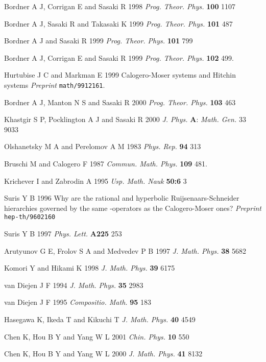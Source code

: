 \documentclass[a4paper,12pt]{article}
\begin{document}
\begin{thebibliography}{99}
  Bordner A J, Corrigan E and Sasaki R 1998 \textit{Prog.
Theor. Phys. }\textbf{100} 1107

  Bordner A J, Sasaki R and Takasaki K 1999 \textit{Prog.
Theor. Phys.} \textbf{101} 487

  Bordner A J and Sasaki R 1999 \textit{Prog. Theor. Phys.}
\textbf{101} 799

  Bordner A J, Corrigan E and Sasaki R 1999 \textit{Prog.
Theor. Phys. }\textbf{102} 499.

  Hurtubise J C and Markman E 1999 Calogero-Moser systems and
Hitchin systems \textit{Preprint} \texttt{math/9912161}.

  Bordner A J, Manton N S and Sasaki R 2000 \textit{Prog.
Theor. Phys. }\textbf{103} 463

  Khastgir S P, Pocklington A J and Sasaki R 2000 \textit{J.
Phys.} \textbf{A}: \textit{Math. Gen. }33 9033

  Olshanetsky M A and Perelomov A M 1983 \textit{Phys. Rep.}
\textbf{94} 313

  Bruschi M and Calogero F 1987 \textit{Commun. Math. Phys.}
\textbf{109} 481.

  Krichever I and Zabrodin A 1995 \textit{Usp. Math. Nauk}
\textbf{50:6} 3

  Suris Y B 1996 Why are the rational and hyperbolic
Ruijsenaars-Schneider hierarchies governed by the same \coordHE{}-operators as the
Calogero-Moser ones? \textit{Preprint }\texttt{hep-th/9602160}

  Suris Y B 1997 \textit{Phys. Lett.} \textbf{A225} 253

  Arutyunov G E, Frolov S A and Medvedev P B 1997 \textit{J.
Math. Phys.} \textbf{38} 5682

  Komori Y and Hikami K 1998 \textit{J. Math. Phys.} \textbf{39}
6175

  van Diejen J F 1994 \textit{J. Math. Phys. }\textbf{35} 2983

  van Diejen J F 1995 \textit{Compositio. Math.} \textbf{95} 183

  Hasegawa K, Ikeda T and Kikuchi T \textit{J. Math. Phys.}
\textbf{40} 4549

  Chen K, Hou B Y and Yang W L 2001 \textit{Chin. Phys.} \textbf{10} 550

  Chen K, Hou B Y and Yang W L 2000 \textit{J. Math. Phys.}
\textbf{41} 8132


\end{thebibliography}
\end{document}
